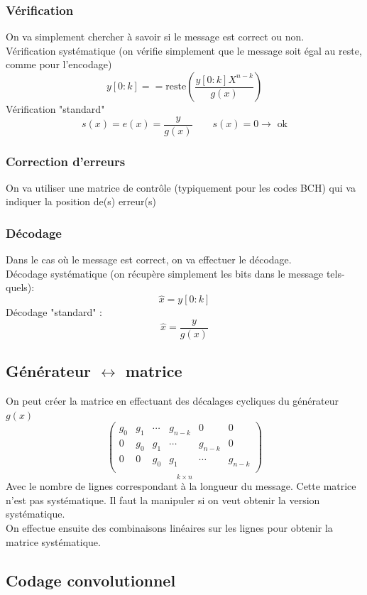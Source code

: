 \documentclass[resume.tex]{subfiles}
\begin{document}
\subsubsection{Vérification}
On va simplement chercher à savoir si le message est correct ou non.\\
Vérification systématique (on vérifie simplement que le message soit égal au reste, comme pour l'encodage)
$$y[0:k] == \text{reste}\left(\frac{y[0:k]X^{n-k}}{g(x)}\right)$$
Vérification "standard"
$$s(x)=e(x)=\frac{y}{g(x)}\qquad s(x)=0\longrightarrow\text{ ok}$$
\subsubsection{Correction d'erreurs}
On va utiliser une matrice de contrôle (typiquement pour les codes BCH) qui va indiquer la position de(s) erreur(s)
\subsubsection{Décodage}
Dans le cas où le message est correct, on va effectuer le décodage.\\
Décodage systématique (on récupère simplement les bits dans le message tels-quels):
$$\hat{x}=y[0:k]$$
Décodage "standard" :
$$\hat{x}=\frac{y}{g(x)}$$
\subsection{Générateur $\leftrightarrow$ matrice}
On peut créer la matrice en effectuant des décalages cycliques du générateur $g(x)$
$$\underset{k\times n}{\begin{pmatrix}
g_0 & g_1 & \cdots & g_{n-k} & 0 & 0\\
0 & g_0 & g_1 & \cdots & g_{n-k} & 0\\
0 & 0 & g_0 & g_1 & \cdots & g_{n-k}\\
\end{pmatrix}}$$
Avec le nombre de lignes correspondant à la longueur du message. Cette matrice n'est pas systématique. Il faut la manipuler si on veut obtenir la version systématique.\\
On effectue ensuite des combinaisons linéaires sur les lignes pour obtenir la matrice systématique.
\subsection{Codage convolutionnel}
\end{document}
